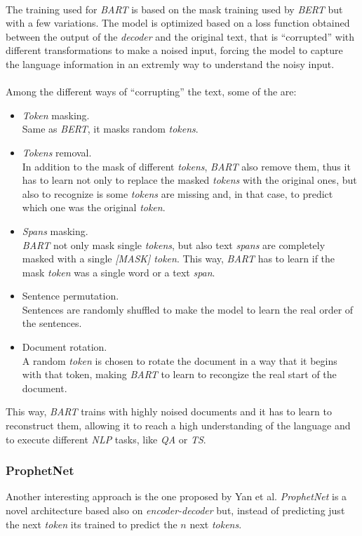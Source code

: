 \paragraph{}
The training used for \emph{BART} is based on the mask training used by \emph{BERT} but with a few variations. The model is optimized based on a loss function obtained between the output of the \emph{decoder} and the original text, that is ``corrupted'' with different transformations to make a noised input, forcing the model to capture the language information in an extremly way to understand the noisy input.
\paragraph{}
Among the different ways of ``corrupting'' the text, some of the are:
\begin{itemize}
\item \emph{Token} masking. \\ Same as \emph{BERT}, it masks random \emph{tokens}.
\item \emph{Tokens} removal. \\ In addition to the mask of different \emph{tokens}, \emph{BART} also remove them, thus it has to learn not only to replace the masked \emph{tokens} with the original ones, but also to recognize is some \emph{tokens} are missing and, in that case, to predict which one was the original \emph{token}.
\item \emph{Spans} masking. \\ \emph{BART} not only mask single \emph{tokens}, but also text \emph{spans} are completely masked with a single \emph{[MASK] token}. This way, \emph{BART} has to learn if the mask \emph{token} was a single word or a text \emph{span}. 
\item Sentence permutation. \\ Sentences are randomly shuffled to make the model to learn the real order of the sentences.
\item Document rotation. \\ A random \emph{token} is chosen to rotate the document in a way that it begins with that token, making \emph{BART} to learn to recongize the real start of the document.
\end{itemize}
This way, \emph{BART} trains with highly noised documents and it has to learn to reconstruct them, allowing it to reach a high understanding of the language and to execute different \emph{NLP} tasks, like \emph{QA} or \emph{TS}.
\subsubsection{ProphetNet}
\noindent Another interesting approach is the one proposed by Yan et al.\cite{Yan2020} \emph{ProphetNet} is a novel architecture based also on \emph{encoder-decoder} but, instead of predicting just the next \emph{token} its trained to predict the $n$ next \emph{tokens}.

